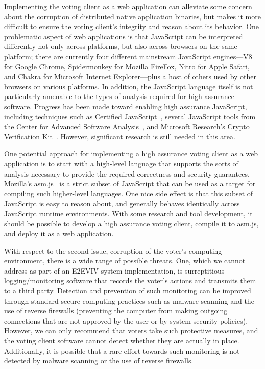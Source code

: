 Implementing the voting client as a web application can alleviate some
concern about the corruption of distributed native application
binaries, but makes it more difficult to ensure the voting client's
integrity and reason about its behavior. One problematic aspect of web
applications is that JavaScript can be interpreted differently not
only across platforms, but also across browsers on the same platform;
there are currently four different mainstream JavaScript engines---V8
for Google Chrome, Spidermonkey for Mozilla FireFox, Nitro for Apple
Safari, and Chakra for Microsoft Internet Explorer---plus a host of
others used by other browsers on various platforms. In addition, the
JavaScript language itself is not particularly amenable to the types
of analysis required for high assurance software. Progress has been
made toward enabling high assurance JavaScript, including techniques
such as Certified JavaScript~\cite{JSCert}, several JavaScript tools
from the Center for Advanced Software Analysis~\cite{CASATools}, and
Microsoft Research's Crypto Verification Kit~\cite{CVK}. However,
significant research is still needed in this area.

One potential approach for implementing a high assurance voting client
as a web application is to start with a high-level language that
supports the sorts of analysis necessary to provide the required
correctness and security guarantees.  Mozilla's asm.js~\cite{asm.js}
is a strict subset of JavaScript that can be used as a target for
compiling such higher-level languages. One nice side effect is that
this subset of JavaScript is easy to reason about, and generally
behaves identically across JavaScript runtime environments. With some
research and tool development, it should be possible to develop a high
assurance voting client, compile it to asm.js, and deploy it as a web
application.

With respect to the second issue, corruption of the voter's computing
environment, there is a wide range of possible threats. One, which we
cannot address as part of an E2EVIV system implementation, is
surreptitious logging/monitoring software that records the voter's
actions and transmits them to a third party. Detection and prevention
of such monitoring can be improved through standard secure
computing practices such as malware scanning and the use of reverse
firewalls (preventing the computer from making outgoing connections
that are not approved by the user or by system security
policies). However, we can only recommend that voters take such
protective measures, and the voting client software cannot detect
whether they are actually in place. Additionally, it is possible that a rare effort towards such monitoring is not detected by malware scanning or the use of reverse firewalls.  


